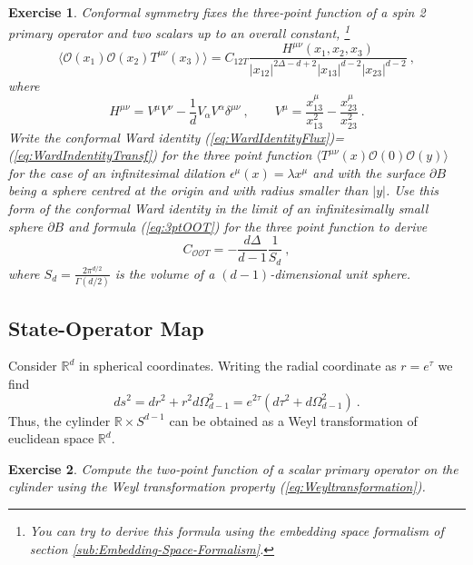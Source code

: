 \documentclass{ws-rv9x6}
\newtheorem{exercise}{Exercise}[section]
\newcommand\be{\begin{equation}}
\newcommand\ee{\end{equation}}
\begin{document}
\begin{exercise} 
Conformal symmetry fixes the three-point function
of a spin 2 primary operator and two scalars up to an overall constant,
\footnote{You can try to derive this formula using the embedding space formalism
of section \ref{sub:Embedding-Space-Formalism}.%
}
\begin{equation}
\langle\mathcal{O}(x_{1})\mathcal{O}(x_{2})T^{\mu\nu}(x_{3})\rangle=C_{12T}\frac{H^{\mu\nu}(x_{1},x_{2},x_{3})}{|x_{12}|^{2\Delta-d+2}|x_{13}|^{d-2}|x_{23}|^{d-2}}\ ,\label{eq:3ptOOT}
\end{equation}
where
\be
H^{\mu\nu}=V^{\mu}V^{\nu}-\frac{1}{d}V_{\alpha}V^{\alpha}\delta^{\mu\nu}\ ,\qquad V^{\mu}=\frac{x_{13}^{\mu}}{x_{13}^{2}}-\frac{x_{23}^{\mu}}{x_{23}^{2}}\ .
\ee
Write the conformal Ward identity (\ref{eq:WardIdentityFlux})=(\ref{eq:WardIndentityTransf})
for the three point function $\langle T^{\mu\nu}(x)\mathcal{O}(0)\mathcal{O}(y)\rangle$
for the case of an infinitesimal dilation $\epsilon^{\mu}(x)=\lambda x^{\mu}$
and with the surface $\partial B$ being a sphere centred at the origin
and with radius smaller than $|y|$. Use this form of the conformal
Ward identity in the limit of an infinitesimally small sphere $\partial B$
and formula (\ref{eq:3ptOOT}) for the three point function to derive
\be
C_{\mathcal{OO}T}=-\frac{d\Delta}{d-1}\frac{1}{S_{d}}\ ,
\ee
where $S_{d}=\frac{2\pi^{d/2}}{\Gamma(d/2)}$ is the volume of a $(d-1)$-dimensional
unit sphere.
\end{exercise}


\subsection{State-Operator Map}

Consider $\mathbb{R}^{d}$ in spherical coordinates. Writing the radial
coordinate as $r=e^{\tau}$ we find
\be
ds^{2}=dr^{2}+r^{2}d\Omega_{d-1}^{2}=e^{2\tau}\left(d\tau^{2}+d\Omega_{d-1}^{2}\right)\ .
\ee
Thus, the cylinder $\mathbb{R}\times S^{d-1}$ can be obtained as
a Weyl transformation of euclidean space $\mathbb{R}^{d}$. 
\begin{exercise} Compute the two-point function of a scalar primary
operator on the cylinder using the Weyl transformation property (\ref{eq:Weyltransformation}).
\end{exercise}
\end{document}
